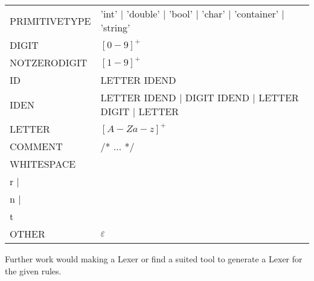 \begin{tabular}{l l}
PRIMITIVETYPE & 'int' | 'double' | 'bool' | 'char' | 'container' | 'string' \\
DIGIT & $[0-9]^+$ \\
NOTZERODIGIT & $ [1-9]^+$ \\
ID & LETTER IDEND \\
IDEN & LETTER IDEND | DIGIT IDEND | LETTER DIGIT | LETTER \\
LETTER & $[A-Za-z]^+$\\
COMMENT & /* $\dots$ */ \\
WHITESPACE & \\r | \\n | \\t \\
OTHER & $\varepsilon$ \\
\end{tabular}

Further work would making a Lexer or find a suited tool to generate a Lexer for the given rules.